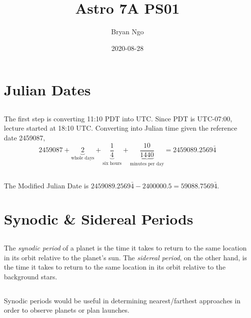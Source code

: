 \documentclass{article}
\title{Astro 7A PS01}
\author{Bryan Ngo}
\date{2020-08-28}
\begin{document}
\maketitle

\section{Julian Dates}

\subsection{}

The first step is converting 11:10 PDT into UTC.
Since PDT is UTC-07:00, lecture started at 18:10 UTC.
Converting into Julian time given the reference date 2459087,
\begin{equation}
    2459087 + \underbrace{2}_{\text{whole days}} + \underbrace{\frac{1}{4}}_{\text{six hours}} + \underbrace{\frac{10}{1440}}_{\text{minutes per day}} = 2459089.2569\bar{4}
\end{equation}

\subsection{}

The Modified Julian Date is \(2459089.2569\bar{4} - 2400000.5 = 59088.7569\bar{4}\).

\section{Synodic \& Sidereal Periods}

\subsection{}

The \emph{synodic period} of a planet is the time it takes to return to the same location in its orbit relative to the planet's sun.
The \emph{sidereal period}, on the other hand, is the time it takes to return to the same location in its orbit relative to the background stars.

\subsection{}

Synodic periods would be useful in determining nearest/farthest approaches in order to observe planets or plan launches.
\end{document}
